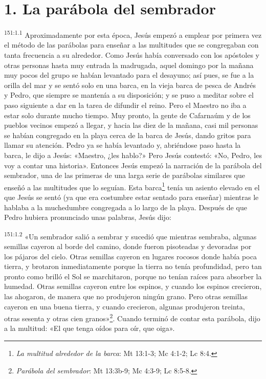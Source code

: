 \section*{1. La parábola del sembrador}
\par 
\textsuperscript{151:1.1} Aproximadamente por esta época, Jesús empezó a emplear por primera vez el método de las parábolas para enseñar a las multitudes que se congregaban con tanta frecuencia a su alrededor. Como Jesús había conversado con los apóstoles y otras personas hasta muy entrada la madrugada, aquel domingo por la mañana muy pocos del grupo se habían levantado para el desayuno; así pues, se fue a la orilla del mar y se sentó solo en una barca, en la vieja barca de pesca de Andrés y Pedro, que siempre se mantenía a su disposición; y se puso a meditar sobre el paso siguiente a dar en la tarea de difundir el reino. Pero el Maestro no iba a estar solo durante mucho tiempo. Muy pronto, la gente de Cafarnaúm y de los pueblos vecinos empezó a llegar, y hacia las diez de la mañana, casi mil personas se habían congregado en la playa cerca de la barca de Jesús, dando gritos para llamar su atención. Pedro ya se había levantado y, abriéndose paso hasta la barca, le dijo a Jesús: «Maestro, ¿les hablo?» Pero Jesús contestó: «No, Pedro, les voy a contar una historia». Entonces Jesús empezó la narración de la parábola del sembrador, una de las primeras de una larga serie de parábolas similares que enseñó a las multitudes que lo seguían. Esta barca\footnote{\textit{La multitud alrededor de la barca}: Mt 13:1-3; Mc 4:1-2; Lc 8:4.} tenía un asiento elevado en el que Jesús se sentó (ya que era costumbre estar sentado para enseñar) mientras le hablaba a la muchedumbre congregada a lo largo de la playa. Después de que Pedro hubiera pronunciado unas palabras, Jesús dijo:

\par 
\textsuperscript{151:1.2} «Un sembrador salió a sembrar y sucedió que mientras sembraba, algunas semillas cayeron al borde del camino, donde fueron pisoteadas y devoradas por los pájaros del cielo. Otras semillas cayeron en lugares rocosos donde había poca tierra, y brotaron inmediatamente porque la tierra no tenía profundidad, pero tan pronto como brilló el Sol se marchitaron, porque no tenían raíces para absorber la humedad. Otras semillas cayeron entre los espinos, y cuando los espinos crecieron, las ahogaron, de manera que no produjeron ningún grano. Pero otras semillas cayeron en una buena tierra, y cuando crecieron, algunas produjeron treinta, otras sesenta y otras cien granos»\footnote{\textit{Parábola del sembrador}: Mt 13:3b-9; Mc 4:3-9; Lc 8:5-8.}. Cuando terminó de contar esta parábola, dijo a la multitud: «El que tenga oídos para oír, que oiga».

